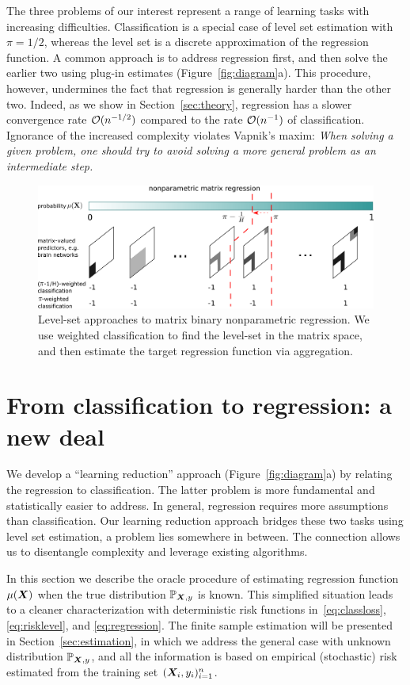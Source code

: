 \documentclass[11pt]{article}
\theoremstyle{plain}
\theoremstyle{definition}
\begin{document}
The three problems of our interest represent a range of learning tasks with increasing difficulties. Classification is a special case of level set estimation with $\pi=1/2$, whereas the level set is a discrete approximation of the regression function. A common approach is to address regression first, and then solve the earlier two using plug-in estimates (Figure~\ref{fig:diagram}a). This procedure, however, undermines the fact that regression is generally harder than the other two. Indeed, as we show in Section~\ref{sec:theory}, regression has a slower convergence rate $\mathcal{O}(n^{-1/2})$ compared to the rate $\mathcal{O}(n^{-1})$ of classification. Ignorance of the increased complexity violates Vapnik’s maxim: \emph{When solving a given problem, one should try to avoid solving a more general problem as an intermediate step.} 

\begin{figure}
\centering
\includegraphics[width=15cm]{demo_method2.pdf}
\caption{Level-set approaches to matrix binary nonparametric regression. We use weighted classification to find the level-set in the matrix space, and then estimate the target regression function via aggregation. }\label{fig:method}
\end{figure}

\section{From classification to regression: a new deal}\label{sec:idea}
We develop a ``learning reduction'' approach (Figure~\ref{fig:diagram}a) by relating the regression to classification. The latter problem is more fundamental and statistically easier to address. In general, regression requires more assumptions than classification. Our learning reduction approach bridges these two tasks using level set estimation, a problem lies somewhere in between. The connection allows us to disentangle complexity and leverage existing algorithms. 

In this section we describe the oracle procedure of estimating regression function $\mu(\bm X)$ when the true distribution $\mathbb{P}_{\bm X,y}$ is known. This simplified situation leads to a cleaner characterization with deterministic risk functions in~\eqref{eq:classloss}, \eqref{eq:risklevel}, and \eqref{eq:regression}. The finite sample estimation will be presented in Section~\ref{sec:estimation}, in which we address the general case with unknown distribution $\mathbb{P}_{\bm X,y}$, and all the information is based on empirical (stochastic) risk estimated from the training set $(\bm X_i,y_i)_{i=1}^n$. 
\end{document}
